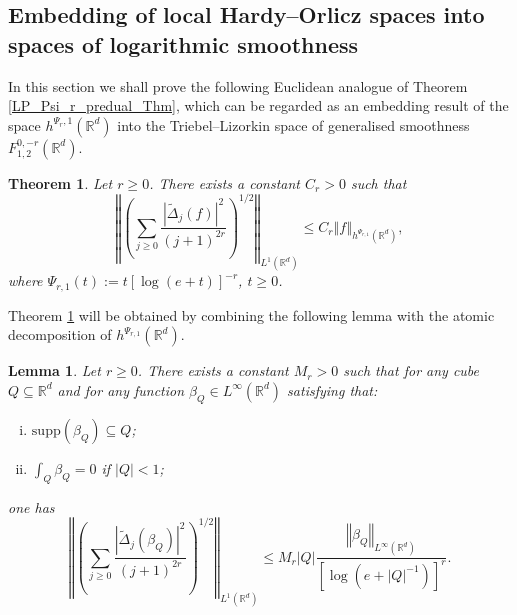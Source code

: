 \documentclass[a4paper, leqno, 10pt]{amsart}
\numberwithin{equation}{section}
\newtheorem{theo}[thm]{Theorem}
\newtheorem{lemma}[thm]{Lemma}
\newcommand{\R}{\mathbb{R}}
\newcommand{\norm}[1]{\left\Vert#1\right\Vert}
\newcommand{\abs}[1]{\left|#1\right|}
\begin{document}
\subsection{Embedding of local Hardy--Orlicz spaces into spaces of logarithmic smoothness} \label{LP_Psi_r_predual}

In this section we shall prove the following Euclidean analogue of Theorem \ref{LP_Psi_r_predual_Thm}, which can be regarded as an embedding result of the space $h^{\Psi_r,1}(\R^d)$ into the Triebel--Lizorkin space of generalised smoothness $F^{0,-r}_{1,2}(\R^d)$.
%

\begin{theo}\label{LP_Psi_r_euclidean} Let $r \geq 0$.
There exists a constant $C_r>0$ such that
\begin{equation}\label{LP_H_ineq}
\norm{ \left( \sum_{j \geq 0} \frac{ | \widetilde{\Delta}_j (f)  |^2}{(j+1)^{2r}} \right)^{1/2} }_{L^1 (\R^d)} \leq C_r \norm{ f }_{h^{\Psi_{r,1}} (\R^d)}, 
\end{equation}
where $\Psi_{r,1} (t) := t [\log (e+t)]^{-r}$, $t \geq 0$.
\end{theo}

Theorem \ref{LP_Psi_r_euclidean} will be obtained by combining the following lemma with the atomic decomposition of $h^{\Psi_{r,1}} (\R^d)$.

\begin{lemma}\label{main_lemma} Let $r \geq 0$. There exists a constant $M_r >0$ such that for any cube $Q \subseteq \R^d$ and for any function $\beta_Q \in L^{\infty} (\R^d)$ satisfying that:
\begin{enumerate}[(i)]
\item $\mathrm{supp} (\beta_Q) \subseteq Q$;
\item $\int_Q \beta_Q = 0$ if $\abs{Q}<1$;
\end{enumerate}
one has 
\[
\norm{ \left( \sum_{j \geq 0} \frac{ | \widetilde{\Delta}_j ( \beta_Q )  |^2}{(j+1)^{2r}} \right)^{1/2} }_{L^1 (\R^d)} \leq M_r | Q| \frac{ \norm{ \beta_Q }_{L^{\infty} (\R^d)}} { \left[ \log \left(e + |Q|^{-1} \right) \right]^r }.
\]
\end{lemma} 
\end{document}
